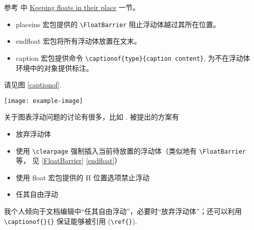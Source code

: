 参考 \cite{wiki:floats} 中 \href{https://en.wikibooks.org/wiki/LaTeX/Floats,\_Figures\_and\_Captions\#Keeping\_floats\_in\_their\_place}{Keeping floats in their place} 一节。

\begin{itemize}
  \item\label{FloatBarrier} placeins 宏包提供的 \verb+\FloatBarrier+ 阻止浮动体越过其所在位置。
  \item\label{endfloat} endfloat 宏包将所有浮动体放置在文末。
  \item caption 宏包提供命令 \verb+\captionof{type}{caption content}+, 为不在浮动体环境中的对象提供标注。
\end{itemize}
\begin{sidelst}
请见图 \ref{captionof}.

\texttt{[image: example-image]}
\label{captionof}
\end{sidelst}

关于图表浮动问题的讨论有很多，比如 \cite{latexproject,stackexchange-1,stackexchange-2,placement}. 被提出的方案有
\begin{itemize}
  \item 放弃浮动体
  \item 使用 \verb+\clearpage+ 强制插入当前待放置的浮动体（类似地有 \verb+\FloatBarrier+ 等， 见 \ref{FloatBarrier} \ref{endfloat}）
  \item 使用 float 宏包提供的 H 位置选项禁止浮动
  \item 任其自由浮动
\end{itemize}
我个人倾向于文档编辑中“任其自由浮动”，必要时“放弃浮动体”；还可以利用 \verb+\captionof{}{}+ 保证能够被引用 (\verb+\ref{}+).
